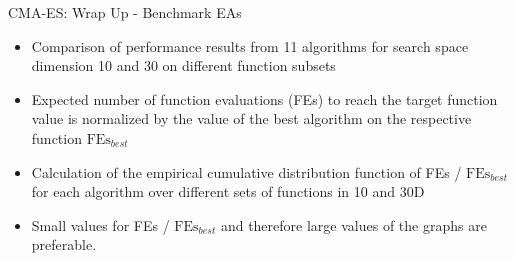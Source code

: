 \documentclass[11pt,compress,t,notes=noshow, xcolor=table]{beamer}
\begin{document}
\begin{vbframe}{CMA-ES: Wrap Up - Benchmark EAs}
\vspace{-15pt}
\scriptsize{
\begin{itemize}
\item Comparison of performance results from 11 algorithms for search space dimension 10 and 30 on different function subsets
\item Expected number of function evaluations (FEs) to reach the target function value is normalized by the value of the best algorithm on the respective function $\text{FEs}_{best}$
\item Calculation of the empirical cumulative distribution function of FEs / $\text{FEs}_{best}$ for each algorithm over different sets of functions in 10 and 30D
\item Small values for FEs / $\text{FEs}_{best}$ and therefore large values of the graphs are preferable.
\end{itemize}
}
\end{vbframe}

\endlecture
\end{document}
